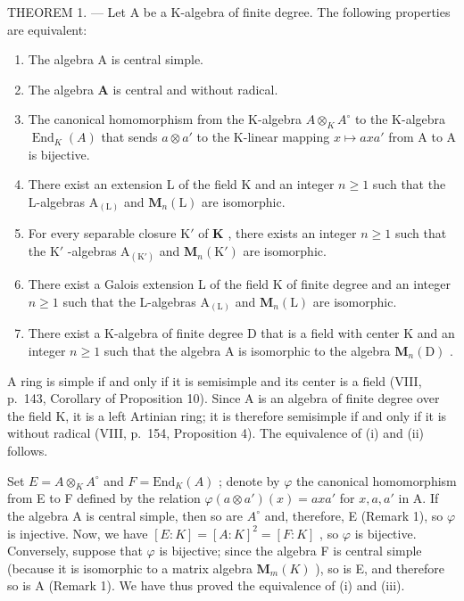 THEOREM 1. --- Let A be a K-algebra of finite degree. The following properties are equivalent:

\begin{enumerate}
\def\labelenumi{(\roman{enumi})}
\item
  The algebra A is central simple.
\item
  The algebra \(\mathbf{A}\) is central and without radical.
\item
  The canonical homomorphism from the K-algebra \(A \otimes_{K} A^{\circ}\) to the K-algebra \(\operatorname{End}_{K}(A)\) that sends \(a \otimes a'\) to the K-linear mapping \(x \mapsto axa'\) from A to A is bijective.
\item
  There exist an extension L of the field K and an integer \(n \geqslant 1\) such that the L-algebras \(\mathrm{A}_{(\mathrm{L})}\) and \(\mathbf{M}_{n}(\mathrm{L})\) are isomorphic.
\item
  For every separable closure \(\mathrm{K}'\) of \(\mathbf{K}\) , there exists an integer \(n \geqslant 1\) such that the \(\mathrm{K}'\) -algebras \(\mathrm{A}_{(\mathrm{K}')}\) and \(\mathbf{M}_n(\mathrm{K}')\) are isomorphic.
\item
  There exist a Galois extension L of the field K of finite degree and an integer \(n \geqslant 1\) such that the L-algebras \(\mathrm{A}_{(\mathrm{L})}\) and \(\mathbf{M}_n(\mathrm{L})\) are isomorphic.
\item
  There exist a K-algebra of finite degree D that is a field with center K and an integer \(n \geqslant 1\) such that the algebra A is isomorphic to the algebra \(\mathbf{M}_{n}(\mathrm{D})\) .
\end{enumerate}

A ring is simple if and only if it is semisimple and its center is a field (VIII, p.~143, Corollary of Proposition 10). Since A is an algebra of finite degree over the field K, it is a left Artinian ring; it is therefore semisimple if and only if it is without radical (VIII, p.~154, Proposition 4). The equivalence of (i) and (ii) follows.

Set \(E = A \otimes_{K} A^{\circ}\) and \(F = \text{End}_{K}(A)\) ; denote by \(\varphi\) the canonical homomorphism from E to F defined by the relation \(\varphi(a \otimes a')(x) = axa'\) for \(x, a, a'\) in A. If the algebra A is central simple, then so are \(A^{\circ}\) and, therefore, E (Remark 1), so \(\varphi\) is injective. Now, we have \([E : K] = [A : K]^{2} = [F : K]\) , so \(\varphi\) is bijective. Conversely, suppose that \(\varphi\) is bijective; since the algebra F is central simple (because it is isomorphic to a matrix algebra \(\mathbf{M}_{m}(K)\) ), so is E, and therefore so is A (Remark 1). We have thus proved the equivalence of (i) and (iii).

